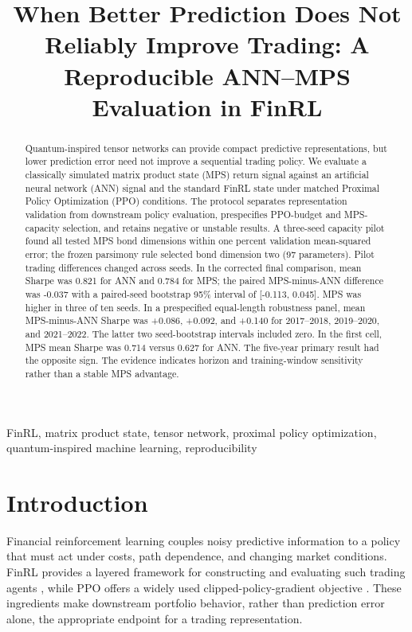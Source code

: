 \documentclass[conference]{IEEEtran}
\title{When Better Prediction Does Not Reliably Improve Trading:
A Reproducible ANN--MPS Evaluation in FinRL}
\author{\IEEEauthorblockN{Aarav Nagar}}
\begin{document}
\maketitle

\begin{abstract}
Quantum-inspired tensor networks can provide compact predictive
representations, but lower prediction error need not improve a sequential
trading policy. We evaluate a classically simulated matrix product state (MPS)
return signal against an artificial neural network (ANN) signal and the
standard FinRL state under matched Proximal Policy Optimization (PPO)
conditions. The protocol separates representation validation from downstream
policy evaluation, prespecifies PPO-budget and MPS-capacity selection, and
retains negative or unstable results. A three-seed capacity pilot found all
tested MPS bond dimensions within one percent validation mean-squared error;
the frozen parsimony rule selected bond dimension two (97 parameters).
Pilot trading differences changed across seeds. In the corrected final
comparison, mean Sharpe was 0.821 for ANN and 0.784 for MPS; the paired
MPS-minus-ANN difference was -0.037 with a paired-seed bootstrap 95\% interval
of [-0.113, 0.045]. MPS was higher in three of ten seeds. In a prespecified
equal-length robustness panel, mean MPS-minus-ANN Sharpe was +0.086, +0.092,
and +0.140 for 2017--2018, 2019--2020, and 2021--2022. The latter two
seed-bootstrap intervals included zero. In the first cell,
MPS mean Sharpe was 0.714 versus 0.627 for ANN.
The five-year primary result had the opposite sign. The evidence indicates
horizon and training-window sensitivity rather than a stable MPS advantage.
\end{abstract}

\begin{IEEEkeywords}
FinRL, matrix product state, tensor network, proximal policy optimization,
quantum-inspired machine learning, reproducibility
\end{IEEEkeywords}

\section{Introduction}

Financial reinforcement learning couples noisy predictive information to a
policy that must act under costs, path dependence, and changing market
conditions. FinRL provides a layered framework for constructing and evaluating
such trading agents \cite{liu2020finrl}, while PPO offers a widely used
clipped-policy-gradient objective \cite{schulman2017ppo}. These ingredients make
downstream portfolio behavior, rather than prediction error alone, the
appropriate endpoint for a trading representation.
\end{document}
